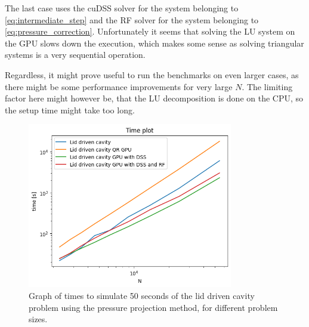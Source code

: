 \documentclass{article}
\begin{document}
The last case uses the cuDSS solver for the system belonging to \ref{eq:intermediate_step} 
and the RF solver for the system belonging to \ref{eq:pressure_correction}. 
Unfortunately it seems that solving the LU system on the GPU slows down the execution, 
which makes some sense as solving triangular systems is a very sequential operation.

Regardless, it might prove useful to run the benchmarks on even larger cases, as there might be some 
performance improvements for very large \(N\). The limiting factor here might however be, that 
the LU decomposition is done on the CPU, so the setup time might take too long.
\begin{figure}[h!] 
    \centering 
    \includegraphics[width=0.8\textwidth]{plots/lidDriven_time.png} 
    \caption{Graph of times to simulate 50 seconds of the lid driven cavity problem using
    the pressure projection method, for different problem sizes.} 
    \label{fig:lidDriven_time} 
\end{figure}
\end{document}
